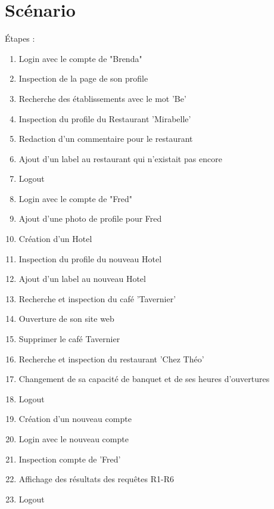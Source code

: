 \documentclass[11pt,a4paper]{report}
\begin{document}
\section*{Scénario}
Étapes :
\begin{enumerate}
\item Login avec le compte de "Brenda"
\item Inspection de la page de son profile
\item Recherche des établissements avec le mot 'Be'
\item Inspection du profile du Restaurant 'Mirabelle'
\item Redaction d'un commentaire pour le restaurant
\item Ajout d'un label au restaurant qui n'existait pas encore
\item Logout
\item Login avec le compte de "Fred"
\item Ajout d'une photo de profile pour Fred
\item Création d'un Hotel
\item Inspection du profile du nouveau Hotel
\item Ajout d'un label au nouveau Hotel
\item Recherche et inspection du café 'Tavernier' 
\item Ouverture de son site web
\item Supprimer le café Tavernier
\item Recherche et inspection du restaurant 'Chez Théo'
\item Changement de sa capacité de banquet et de ses heures d'ouvertures
\item Logout
\item Création d'un nouveau compte
\item Login avec le nouveau compte
\item Inspection compte de 'Fred' 
\item Affichage des résultats des requêtes R1-R6
\item Logout
\end{enumerate}
\end{document}
